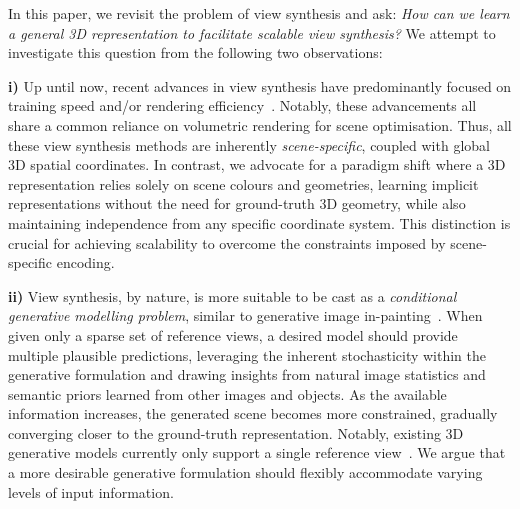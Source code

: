 \documentclass[10pt,twocolumn,letterpaper]{article}
\begin{document}
In this paper, we revisit the problem of view synthesis and ask: {\it How can we learn a general 3D representation to facilitate scalable view synthesis?} We attempt to investigate this question from the following two observations:

{\bf i)} Up until now, recent advances in view synthesis have predominantly focused on training speed and/or rendering efficiency~\cite{muller2022instant,kerbl20233gaussian,sun2022direct,garbin2021fastnerf}. Notably, these advancements all share a common reliance on volumetric rendering for scene optimisation. Thus, all these view synthesis methods are inherently {\it scene-specific}, coupled with global 3D spatial coordinates. In contrast, we advocate for a paradigm shift where a 3D representation relies solely on scene colours and geometries, learning implicit representations without the need for ground-truth 3D geometry, while also maintaining independence from any specific coordinate system. This distinction is crucial for achieving scalability to overcome the constraints imposed by scene-specific encoding.

{\bf ii)} View synthesis, by nature, is more suitable to be cast as a {\it conditional generative modelling problem}, similar to generative image in-painting~\cite{yu2018deepfill,lugmayr2022repaint}. When given only a sparse set of reference views, a desired model should provide multiple plausible predictions, leveraging the inherent stochasticity within the generative formulation and drawing insights from natural image statistics and semantic priors learned from other images and objects. As the available information increases, the generated scene becomes more constrained, gradually converging closer to the ground-truth representation. Notably, existing 3D generative models currently only support a single reference view~\cite{liu2023zero,shi2023zero123++,liu2023syncdreamer,long2023wonder3d,liu2023one}. We argue that a more desirable generative formulation should flexibly accommodate varying levels of input information.
\end{document}
